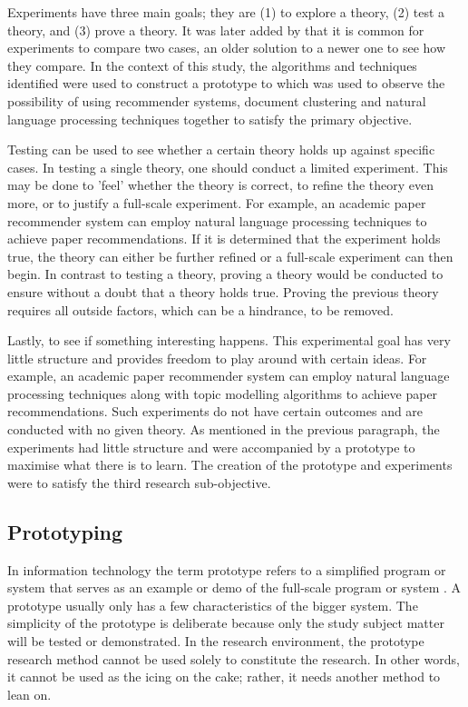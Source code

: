 Experiments have three main goals; they are (1) to explore a theory, (2) test a theory, and (3) prove a theory. It was later added by  that it is common for experiments to compare two cases, an older solution to a newer one to see how they compare. In the context of this study, the algorithms and techniques identified were used to construct a prototype to which was used to observe the possibility of using recommender systems, document clustering and natural language processing techniques together to satisfy the primary objective.

Testing can be used to see whether a certain theory holds up against specific cases. In testing a single theory, one should conduct a limited experiment. This may be done to ’feel’ whether the theory is correct, to refine the theory even more, or to justify a full-scale experiment. For example, an academic paper recommender system can employ natural language processing techniques to achieve paper recommendations. If it is determined that the experiment holds true, the theory can either be further refined or a full-scale experiment can then begin. In contrast to testing a theory, proving a theory would be conducted to ensure without a doubt that a theory holds true. Proving the previous theory requires all outside factors, which can be a hindrance, to be removed.

Lastly, to see if something interesting happens. This experimental goal has very little structure and provides freedom to play around with certain ideas. For example, an academic paper recommender system can employ natural language processing techniques along with topic modelling algorithms to achieve paper recommendations. Such experiments do not have certain outcomes and are conducted with no given theory. As mentioned in the previous paragraph, the experiments had little structure and were accompanied by a prototype to maximise what there is to learn. The creation of the prototype and experiments were to satisfy the third research sub-objective.

\subsection{Prototyping} \label{ssec:prot}

In information technology the term prototype refers to a simplified program or system that serves as an example or demo of the full-scale program or system \cite{olivier2009information}. A prototype usually only has a few characteristics of the bigger system. The simplicity of the prototype is deliberate because only the study subject matter will be tested or demonstrated. In the research environment, the prototype research method cannot be used solely to constitute the research. In other words, it cannot be used as the icing on the cake; rather, it needs another method to lean on.

